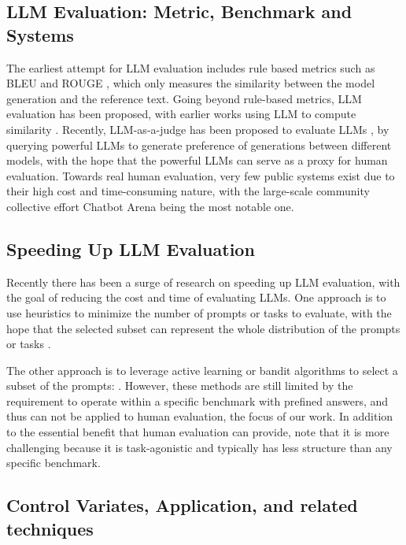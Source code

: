 \subsection{LLM Evaluation: Metric, Benchmark and Systems}
The earliest attempt for LLM evaluation includes rule based metrics such as BLEU \citep{papineni2002bleu} and ROUGE \citep{lin2004rouge}, which only measures the similarity between the model generation and the reference text. Going beyond rule-based metrics, LLM evaluation has been proposed, with earlier works using LLM to compute similarity \citep{Zhang2020BERTScore,yuan2021bartscore}. Recently, LLM-as-a-judge has been proposed to evaluate LLMs \citep{zheng2023judging,dubois2024length}, by querying powerful LLMs to generate preference of generations between different models, with the hope that the powerful LLMs can serve as a proxy for human evaluation. Towards real human evaluation, very few public systems exist due to their high cost and time-consuming nature, with the large-scale community collective effort Chatbot Arena \citep{chiang2024chatbot} being the most notable one.

\subsection{Speeding Up LLM Evaluation}
Recently there has been a surge of research on speeding up LLM evaluation, with the goal of reducing the cost and time of evaluating LLMs. One approach is to use heuristics to minimize the number of prompts or tasks to evaluate, with the hope that the selected subset can represent the whole distribution of the prompts or tasks \citep{ye-etal-2023-predictable,perlitz2023efficient,polo2024tinybenchmarks}. 

The other approach is to leverage active learning or bandit algorithms to select a subset of the prompts: \citep{polo2024efficient,zhou2024speeding,li2024active}. However, these methods are still limited by the requirement to operate within a specific benchmark with prefined answers, and thus can not be applied to human evaluation, the focus of our work. In addition to the essential benefit that human evaluation can provide, note that it is more challenging because it is task-agonistic and typically has less structure than any specific benchmark.

\subsection{Control Variates, Application, and related techniques}


